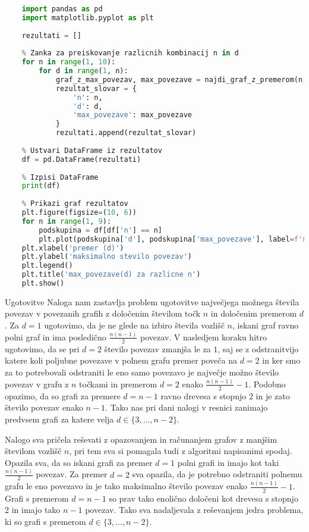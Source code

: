 \documentclass[12pt,a4paper]{amsart}
\makeatletter
\renewcommand\section{\@startsection{section}{1}%
  \z@{.5\linespacing\@plus.7\linespacing}{.5\linespacing}%
  {\normalfont\scshape\large\centering}}
\theoremstyle{definition} %
\theoremstyle{plain} %
\makeatother
\begin{document}
\begin{lstlisting}[language=Python]
    
    import pandas as pd
    import matplotlib.pyplot as plt
    
    rezultati = []
    
    % Zanka za preiskovanje razlicnih kombinacij n in d
    for n in range(1, 10):
        for d in range(1, n):
            graf_z_max_povezav, max_povezave = najdi_graf_z_premerom(n, d)
            rezultat_slovar = {
                'n': n,
                'd': d,
                'max_povezave': max_povezave
            }
            rezultati.append(rezultat_slovar)
    
    % Ustvari DataFrame iz rezultatov
    df = pd.DataFrame(rezultati)
    
    % Izpisi DataFrame
    print(df)
    
    % Prikazi graf rezultatov
    plt.figure(figsize=(10, 6))
    for n in range(1, 9):
        podskupina = df[df['n'] == n]
        plt.plot(podskupina['d'], podskupina['max_povezave'], label=f'n={n}')
    plt.xlabel('premer (d)')
    plt.ylabel('maksimalno stevilo povezav')
    plt.legend()
    plt.title('max_povezave(d) za razlicne n')
    plt.show()
    \end{lstlisting}


\section{Ugotovitve}
Naloga nam zastavlja problem ugotovitve največjega možnega števila povezav v povezanih grafih
z določenim številom točk $n$ in določenim premerom $d$. Za $d = 1$ ugotovimo, da je ne glede
na izbiro števila vozlišč $n$, iskani graf ravno polni graf in ima posledično
$\frac{n (n - 1)}{2}$ povezav. V nasledjem koraku hitro ugotovimo, da se pri $d = 2$ število
povezav zmanjša le za $1$, saj se z odstranitvijo katere koli poljubne povezave v polnem grafu
premer poveča na $d = 2$ in ker smo za to potrebovali odstraniti le eno samo povezavo je največje
možno število povezav v grafu z $n$ točkami in premerom $d = 2$ enako $\frac{n (n - 1)}{2} - 1$.
Podobno opazimo, da so grafi za premere $d = n - 1$ ravno drevesa s stopnjo $2$ in je zato število
povezav enako $n - 1$. Tako nas pri dani nalogi v resnici zanimajo predvsem grafi za katere velja
$d \in \{3, \dots, n - 2\}$.

Nalogo sva pričela reševati z opazovanjem in računanjem grafov z manjšim številom vozlišč $n$, pri tem sva si
pomagala tudi z algoritmi napisanimi spodaj. Opazila sva, da so iskani grafi za premer $d = 1$ polni grafi in
imajo kot taki $\frac{n (n - 1)}{2}$ povezav. Za premer $d = 2$ sva opazila, da je potrebno odstraniti
polnemu grafu le eno povezavo in je tako maksimalno število povezav enako $\frac{n (n - 1)}{2} - 1$. Grafi s
premerom $d = n - 1$ so prav tako enolično določeni kot drevesa s stopnjo 2 in imajo tako $n - 1$ povezav.
Tako sva nadaljevala z reševanjem jedra problema, ki so grafi s premerom $d \in \{3, \dots, n - 2\}$.\\
\end{document}
